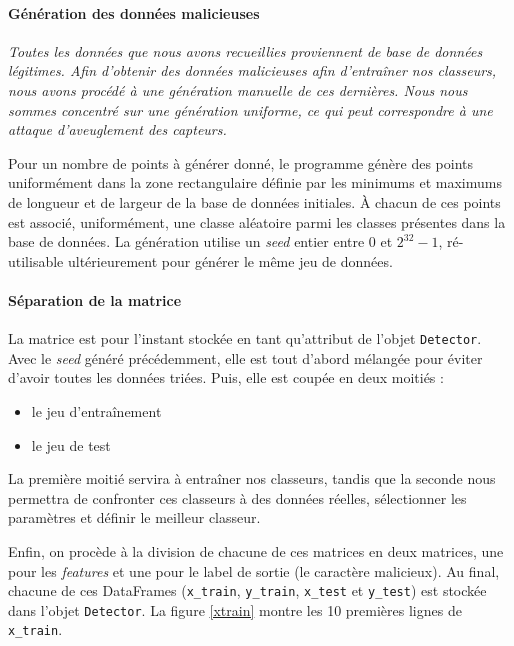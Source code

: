 \documentclass[a4paper]{report}
\begin{document}
\paragraph{Génération des données malicieuses} \textit{Toutes les données que nous avons recueillies proviennent de base de données légitimes. Afin d'obtenir des données malicieuses afin d'entraîner nos classeurs, nous avons procédé à une génération manuelle de ces dernières. Nous nous sommes concentré sur une génération uniforme, ce qui peut correspondre à une attaque d'aveuglement des capteurs.} ~\par Pour un nombre de points à générer donné, le programme génère des points uniformément dans la zone rectangulaire définie par les minimums et maximums de longueur et de largeur de la base de données initiales. À chacun de ces points est associé, uniformément, une classe aléatoire parmi les classes présentes dans la base de données. La génération utilise un \emph{seed} entier entre 0 et $2^{32}-1$, ré-utilisable ultérieurement pour générer le même jeu de données.

\paragraph{Séparation de la matrice} La matrice est pour l'instant stockée en tant qu'attribut de l'objet \texttt{Detector}. Avec le \emph{seed} généré précédemment, elle est tout d'abord mélangée pour éviter d'avoir toutes les données triées. Puis, elle est coupée en deux moitiés :
\begin{itemize}
\item le jeu d'entraînement
\item le jeu de test
\end{itemize}
La première moitié servira à entraîner nos classeurs, tandis que la seconde nous permettra de confronter ces classeurs à des données réelles, sélectionner les paramètres et définir le meilleur classeur.

Enfin, on procède à la division de chacune de ces matrices en deux matrices, une pour les \emph{features} et une pour le label de sortie (le caractère malicieux). Au final, chacune de ces DataFrames (\texttt{x\_train}, \texttt{y\_train}, \texttt{x\_test} et \texttt{y\_test}) est stockée dans l'objet \texttt{Detector}. La figure \ref{xtrain} montre les 10 premières lignes de \texttt{x\_train}\label{features_matrix}.
\end{document}
